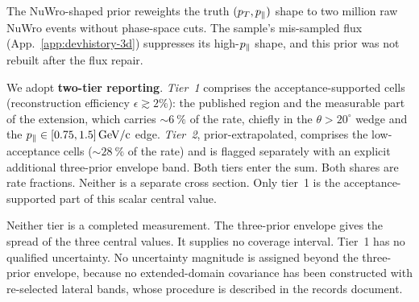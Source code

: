 The NuWro-shaped prior reweights the truth $(\pT,\pPar)$ shape to two million raw NuWro events without phase-space cuts. The sample's mis-sampled flux (App.~\ref{app:devhistory-3d}) suppresses its high-$\pPar$ shape, and this prior was not rebuilt after the flux repair.

We adopt \textbf{two-tier reporting}. \emph{Tier~1} comprises the acceptance-supported cells (reconstruction efficiency $\epsilon\gtrsim2\%$): the published region and the measurable part of the extension, which carries $\sim\SI{6}{\percent}$ of the rate, chiefly in the $\theta>20^{\circ}$ wedge and the $\pPar\in[0.75,1.5]\,\si{GeV/c}$ edge. \emph{Tier~2}, prior-extrapolated, comprises the low-acceptance cells ($\sim\SI{28}{\percent}$ of the rate) and is flagged separately with an explicit additional three-prior envelope band. Both tiers enter the sum. Both shares are rate fractions. Neither is a separate cross section. Only tier~1 is the acceptance-supported part of this scalar central value.

Neither tier is a completed measurement. The three-prior envelope gives the spread of the three central values. It supplies no coverage interval. Tier~1 has no qualified uncertainty. No uncertainty magnitude is assigned beyond the three-prior envelope, because no extended-domain covariance has been constructed with re-selected lateral bands, whose procedure is described in the records document.


